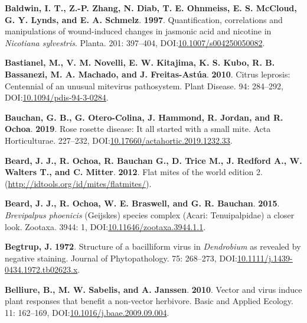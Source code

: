 \documentclass[12pt,final,CPage]{ufthesis}
\newlength{\cslhangindent}
\newenvironment{CSLReferences}[2] %
{%
	\setlength{\parindent}{0pt}
	\ifodd #1 \everypar{\setlength{\hangindent}{\cslhangindent}}\ignorespaces\fi
	\ifnum #2 > 0
	\setlength{\parskip}{#2\baselineskip}
	\fi
}%
{}
\begin{document}
{\begin{CSLReferences}{1}{0}
  \leavevmode{}%
  \textbf{Baldwin, I. T., Z.-P. Zhang, N. Diab, T. E. Ohnmeiss, E. S. McCloud, G. Y. Lynds, and E. A. Schmelz}. \textbf{1997}. Quantification, correlations and manipulations of wound-induced changes in jasmonic acid and nicotine in {\emph{Nicotiana sylvestris}}. Planta. 201: 397--404, DOI:\href{https://doi.org/10.1007/s004250050082}{10.1007/s004250050082}.

  \leavevmode{}%
  \textbf{Bastianel, M., V. M. Novelli, E. W. Kitajima, K. S. Kubo, R. B. Bassanezi, M. A. Machado, and J. Freitas-Astúa}. \textbf{2010}. {Citrus leprosis}: Centennial of an unusual mite{\textendash}virus pathosystem. Plant Disease. 94: 284--292, DOI:\href{https://doi.org/10.1094/pdis-94-3-0284}{10.1094/pdis-94-3-0284}.

  \leavevmode{}%
  \textbf{Bauchan, G. B., G. Otero-Colina, J. Hammond, R. Jordan, and R. Ochoa}. \textbf{2019}. {Rose rosette disease}: It all started with a small mite. Acta Horticulturae. 227--232, DOI:\href{https://doi.org/10.17660/actahortic.2019.1232.33}{10.17660/actahortic.2019.1232.33}.

  \leavevmode{}%
  \textbf{Beard, J. J., R. Ochoa, R. Bauchan G., D. Trice M., J. Redford A., W. Walters T., and C. Mitter}. \textbf{2012}. Flat mites of the world edition 2. (\url{http://idtools.org/id/mites/flatmites/}).

  \leavevmode{}%
  \textbf{Beard, J. J., R. Ochoa, W. E. Braswell, and G. R. Bauchan}. \textbf{2015}. {\emph{Brevipalpus phoenicis}} {(Geijskes)} species complex ({Acari}: {Tenuipalpidae}) \textemdash a closer look. Zootaxa. 3944: 1, DOI:\href{https://doi.org/10.11646/zootaxa.3944.1.1}{10.11646/zootaxa.3944.1.1}.

  \leavevmode{}%
  \textbf{Begtrup, J.} \textbf{1972}. Structure of a bacilliform virus in {\emph{Dendrobium}} as revealed by negative staining. Journal of Phytopathology. 75: 268--273, DOI:\href{https://doi.org/10.1111/j.1439-0434.1972.tb02623.x}{10.1111/j.1439-0434.1972.tb02623.x}.

  \leavevmode{}%
  \textbf{Belliure, B., M. W. Sabelis, and A. Janssen}. \textbf{2010}. Vector and virus induce plant responses that benefit a non-vector herbivore. Basic and Applied Ecology. 11: 162--169, DOI:\href{https://doi.org/10.1016/j.baae.2009.09.004}{10.1016/j.baae.2009.09.004}.


\end{CSLReferences}}
\end{document}
